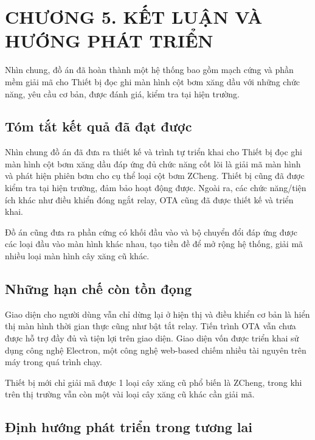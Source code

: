\section*{CHƯƠNG 5. KẾT LUẬN VÀ HƯỚNG PHÁT TRIỂN}
\setcounter{section}{5}
    \setcounter{subsection}{0}
        \setcounter{figure}{0}
            \setcounter{table}{0}
                \setcounter{equation}{0}

Nhìn chung, đồ án đã hoàn thành một hệ thống bao gồm mạch cứng và phần mềm giải mã cho Thiết bị đọc ghi màn hình cột bơm xăng dầu với những chức năng, yêu cầu cơ bản, được đánh giá, kiểm tra tại hiện trường.

\subsection{Tóm tắt kết quả đã đạt được}

Nhìn chung đồ án đã đưa ra thiết kế và trình tự triển khai cho Thiết bị đọc ghi màn hình cột bơm xăng dầu đáp ứng đủ chức năng cốt lõi là giải mã màn hình và phát hiện phiên bơm cho cụ thể loại cột bơm ZCheng. Thiết bị cũng đã được kiểm tra tại hiện trường, đảm bảo hoạt động được. Ngoài ra, các chức năng/tiện ích khác như điều khiển đóng ngắt relay, OTA cũng đã được thiết kế và triển khai.

Đồ án cũng đưa ra phần cứng có khối đầu vào và bộ chuyển đổi đáp ứng được các loại đầu vào màn hình khác nhau, tạo tiền đề để mở rộng hệ thống, giải mã nhiều loại màn hình cây xăng cũ khác.

\subsection{Những hạn chế còn tồn đọng}

Giao diện cho người dùng vẫn chỉ dừng lại ở hiện thị và điều khiển cơ bản là hiển thị màn hình thời gian thực cũng như bật tắt relay. Tiến trình OTA vẫn chưa được hỗ trợ đầy đủ và tiện lợi trên giao diện. Giao diện vốn được triển khai sử dụng công nghệ Electron, một công nghệ web-based chiếm nhiều tài nguyên trên máy trong quá trình chạy.

Thiết bị mới chỉ giải mã được 1 loại cây xăng cũ phổ biến là ZCheng, trong khi trên thị trường vẫn còn một vài loại cây xăng cũ khác cần giải mã.

\subsection{Định hướng phát triển trong tương lai}

